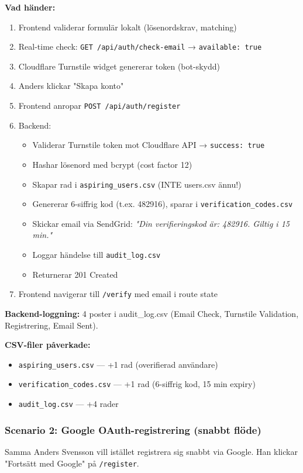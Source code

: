 \documentclass[12pt,a4paper]{article}
\begin{document}
\textbf{Vad händer:}
\begin{enumerate}[noitemsep]
  \item Frontend validerar formulär lokalt (lösenordskrav, matching)
  \item Real-time check: \texttt{GET /api/auth/check-email} → \texttt{available: true}
  \item Cloudflare Turnstile widget genererar token (bot-skydd)
  \item Anders klickar "Skapa konto"
  \item Frontend anropar \texttt{POST /api/auth/register}
  \item Backend:
  \begin{itemize}[noitemsep]
    \item Validerar Turnstile token mot Cloudflare API → \texttt{success: true}
    \item Hashar lösenord med bcrypt (cost factor 12)
    \item Skapar rad i \texttt{aspiring\_users.csv} (INTE users.csv ännu!)
    \item Genererar 6-siffrig kod (t.ex. 482916), sparar i \texttt{verification\_codes.csv}
    \item Skickar email via SendGrid: \textit{"Din verifieringskod är: 482916. Giltig i 15 min."}
    \item Loggar händelse till \texttt{audit\_log.csv}
    \item Returnerar 201 Created
  \end{itemize}
  \item Frontend navigerar till \texttt{/verify} med email i route state
\end{enumerate}

\textbf{Backend-loggning:} 4 poster i audit\_log.csv (Email Check, Turnstile Validation, Registrering, Email Sent).

\textbf{CSV-filer påverkade:}
\begin{itemize}[noitemsep]
  \item \texttt{aspiring\_users.csv} — +1 rad (overifierad användare)
  \item \texttt{verification\_codes.csv} — +1 rad (6-siffrig kod, 15 min expiry)
  \item \texttt{audit\_log.csv} — +4 rader
\end{itemize}

\subsubsection{Scenario 2: Google OAuth-registrering (snabbt flöde)}
Samma Anders Svensson vill istället registrera sig snabbt via Google. Han klickar "Fortsätt med Google" på \texttt{/register}.
\end{document}
